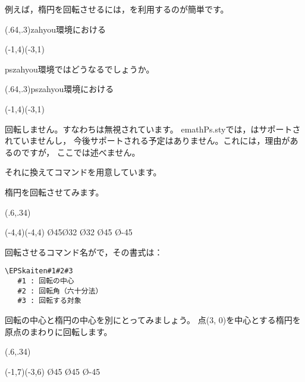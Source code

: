 \documentclass[a4j]{jarticle}
\begin{document}
例えば，楕円を回転させるには，を利用するのが簡単です。

\begin{showEx}(.64,.3){\textsf{zahyou}環境における}
\begin{zahyou}[ul=6mm](-1,4)(-3,1)
  \Put{}
\end{zahyou}
\end{showEx}

\textsf{pszahyou}環境ではどうなるでしょうか。

\begin{showEx}(.64,.3){\textsf{pszahyou}環境における}
\begin{pszahyou}[ul=6mm](-1,4)(-3,1)
  \Put{}
\end{pszahyou}
\end{showEx}

回転しません。すなわちは無視されています。
\textsf{emathPs.sty}では，はサポートされていませんし，
今後サポートされる予定はありません。これには，理由があるのですが，
ここでは述べません。

それに換えてコマンドを用意しています。

楕円を回転させてみます。

\begin{showEx}(.6,.34){}
\begin{pszahyou}[ul=5mm](-4,4)(-4,4)
  \EPSkaiten\O{45}{\Daen\O{3}{2}}
  \Daen\O{3}{2}
  \kTyokusen\O{45}{}{}
  \kTyokusen\O{-45}{}{}
\end{pszahyou}
\end{showEx}

回転させるコマンド名がで，その書式は：

\begin{boxnote}
\begin{verbatim}
\EPSkaiten#1#2#3
   #1 : 回転の中心
   #2 : 回転角（六十分法）
   #3 : 回転する対象
\end{verbatim}
\end{boxnote}

回転の中心と楕円の中心を別にとってみましょう。
点(3, 0)を中心とする楕円を原点のまわりに回転します。

\begin{showEx}(.6,.34){}
\begin{pszahyou}[ul=5mm](-1,7)(-3,6)
  \EPSkaiten\O{45}{\Daen{}}
  \Daen{}
  \kTyokusen\O{45}{}{}
  \kTyokusen\O{-45}{}{}
\end{pszahyou}
\end{showEx}
\end{document}
